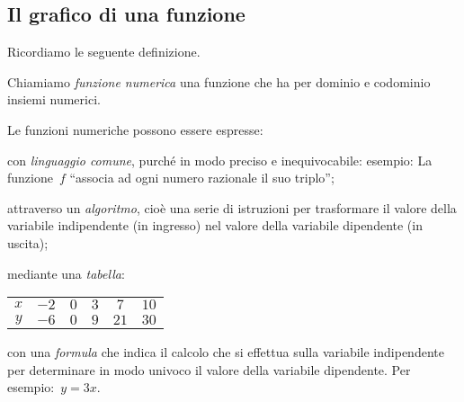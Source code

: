 \begin{comment}
% 
\(B\left(2;-\frac{1}{2}\right)\), 
% 
% 
% 
risolutiva}:~\(x_{M}=\frac{x_{A}+x_{B}}{2}=\frac{-{\frac{3}{4}}+2}{2}=\frac{5}{8
}
% 


\end{comment}

\subsection{Il grafico di una funzione}
\label{subsec:fun_grafico}

Ricordiamo le seguente definizione.
\begin{definizione}
Chiamiamo \emph{funzione numerica} una funzione che ha per dominio e 
codominio insiemi numerici.
\end{definizione}
Le funzioni numeriche possono essere espresse:
\begin{itemize*}
\item con \emph{linguaggio comune}, purché in modo preciso e inequivocabile: 
esempio: La funzione~\(f\)
 ``associa ad ogni numero razionale il suo triplo'';
\item attraverso un \emph{algoritmo}, 
cioè una serie di istruzioni per trasformare il valore della variabile 
indipendente (in ingresso) nel valore della variabile dipendente (in uscita);
\item mediante una \emph{tabella}:
 \begin{center}
\begin{tabular}{cccccc}
 \toprule
 \(x\) & \(-2\) & \(0\) & \(3\) & \(7\) & \(10\) \\
 \(y\) & \(-6\) & \(0\) & \(9\) & \(21\) & \(30\)\\
 \bottomrule
 \end{tabular}
 \end{center}
\item con una \emph{formula} che indica il calcolo che si effettua sulla 
variabile indipendente per determinare in modo univoco
il valore della variabile dipendente. Per esempio:~\(y=3x\).
\end{itemize*}
% 

